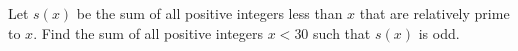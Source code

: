 Let $s(x)$ be the sum of all positive integers less than $x$ that are relatively prime to $x$. Find the sum of all positive integers $x<30$ such that $s(x)$ is odd.
